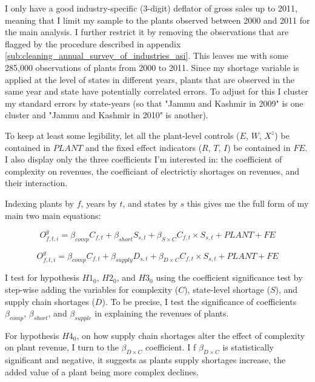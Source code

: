 \documentclass[11pt]{article}
\begin{document}
I only have a good industry-specific (3-digit) deflator of gross sales up to 2011, meaning that I limit my sample to the plants observed between 2000 and 2011 for the main analysis. I further restrict it by removing the observations that are flagged by the procedure described in appendix \ref{sub:cleaning_annual_survey_of_industries_asi}. This leaves me with some 285,000 observations of plants from 2000 to 2011. Since my shortage variable is applied at the level of states in different years, plants that are observed in the same year and state have potentially correlated errors. To adjust for this I cluster my standard errors by state-years (so that "Jammu and Kashmir in 2009" is one cluster and "Jammu and Kashmir in 2010" is another).

To keep at least some legibility, let all the plant-level controls ($E$, $W$, $X^{z}$) be contained in $PLANT$ and the fixed effect indicators ($R$, $T$, $I$) be contained in $FE$. I also display only the three coefficients I'm interested in: the coefficient of complexity on revenues, the coefficiant of electrictiy shortages on revenues, and their interaction.

Indexing plants by $f$, years by $t$, and states by $s$ this gives me the full form of my main two main equations:

\begin{equation}
\label{eqn:int_shortages}
O^{g}_{f,t,i} = \beta_{comp} C_{f,t} + \beta_{short} S_{s,t} + \beta_{S\times C} C_{f,t} \times S_{s,t} + PLANT + FE
\end{equation}

\begin{equation}
\label{eqn:int_supply}
O^{g}_{f,t,i} = \beta_{comp} C_{f,t} + \beta_{supply} D_{s,t} + \beta_{D\times C} C_{f,t} \times S_{s,t} + PLANT + FE
\end{equation}

I test for hypothesis $H1_0$, $H2_0$, and $H3_0$ using the coefficient significance test by step-wise adding the variables for complexity ($C$), state-level shortage ($S$), and supply chain shortages ($D$). To be precise, I test the significance of coefficients $\beta_{comp}$, $\beta_{short}$, and $\beta_{supple}$ in explaining the revenues of plants.

For hypothesis $H4_0$, on how supply chain shortages alter the effect of complexity on plant revenue, I turn to the $\beta_{D \times C}$ coefficient. I f $\beta_{D \times C}$ is statistically significant and negative, it suggests as plants supply shortages increase, the added value of a plant being more complex declines.
\end{document}

